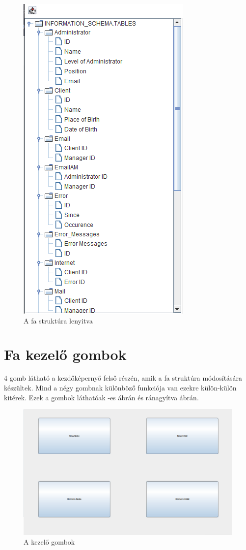 \begin{figure} [H]
	\centering
	\includegraphics[height=.25\textheight]{images/tree_expanded.png}
	\caption{A fa struktúra lenyitva}
	\label{fig:treeexp}
\end{figure}

\section{Fa kezelő gombok} 4 gomb látható a kezdőképernyő felső részén, amik a fa struktúra módosítására készültek. Mind a négy gombnak különböző funkciója van ezekre külön-külön kitérek. Ezek a gombok láthatóak -es ábrán és ránagyítva  ábrán.

\begin{figure} [H]
	\centering
	\includegraphics[height=.25\textheight]{images/node_buttons.png}
	\caption{A kezelő gombok}
	\label{fig:modify}
\end{figure}

